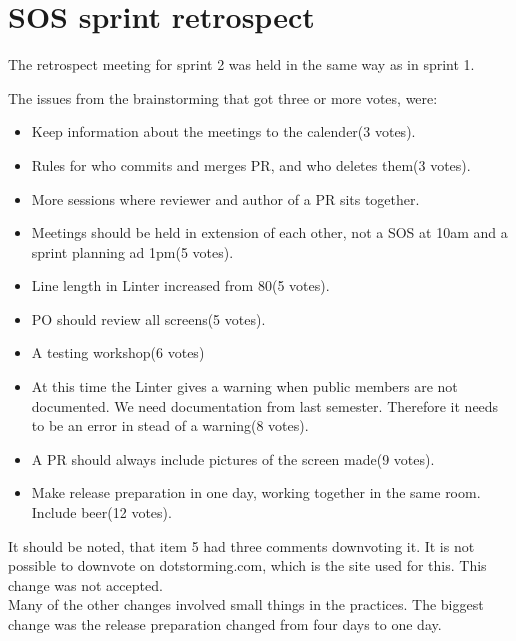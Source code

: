 \section{SOS sprint retrospect}

The retrospect meeting for sprint 2 was held in the same way as in sprint 1.

The issues from the brainstorming that got three or more votes, were:
\begin{itemize}
    \item Keep information about the meetings to the calender(3 votes).
    \item Rules for who commits and merges \gls{PR}, and who deletes them(3 votes).
    \item More sessions where reviewer and author of a \gls{PR} sits together. 
    \item Meetings should be held in extension of each other, not a SOS at 10am and a sprint planning ad 1pm(5 votes).  
    \item Line length in Linter increased from 80(5 votes).    
    \item PO should review all screens(5 votes).
    \item A testing workshop(6 votes)
    \item At this time the Linter gives a warning when public members are not documented. We need documentation from last semester. Therefore it needs to be an error in stead of a warning(8 votes).
    \item A \gls{PR} should always include pictures of the screen made(9 votes).
    \item Make release preparation in one day, working together in the same room. Include beer(12 votes).
\end{itemize}

It should be noted, that item 5 had three comments downvoting it. It is not possible to downvote on dotstorming.com, which is the site used for this. This change was not accepted.\\
Many of the other changes involved small things in the practices. The biggest change was the release preparation changed from four days to one day.\\
